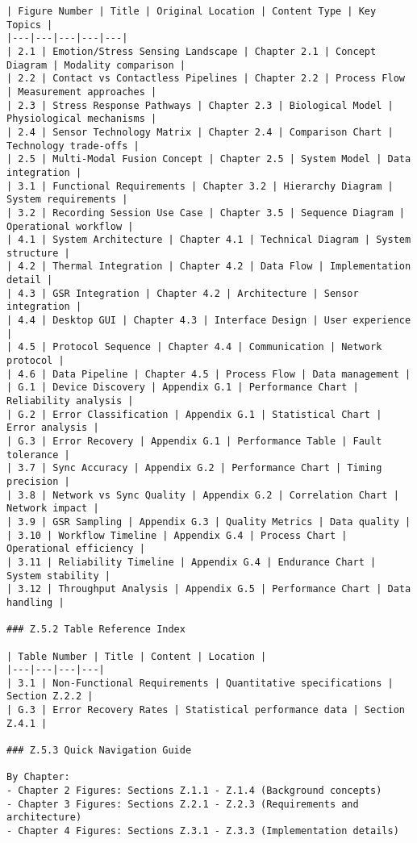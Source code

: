 \begin{verbatim}
| Figure Number | Title | Original Location | Content Type | Key Topics |
|---|---|---|---|---|
| 2.1 | Emotion/Stress Sensing Landscape | Chapter 2.1 | Concept Diagram | Modality comparison |
| 2.2 | Contact vs Contactless Pipelines | Chapter 2.2 | Process Flow | Measurement approaches |
| 2.3 | Stress Response Pathways | Chapter 2.3 | Biological Model | Physiological mechanisms |
| 2.4 | Sensor Technology Matrix | Chapter 2.4 | Comparison Chart | Technology trade-offs |
| 2.5 | Multi-Modal Fusion Concept | Chapter 2.5 | System Model | Data integration |
| 3.1 | Functional Requirements | Chapter 3.2 | Hierarchy Diagram | System requirements |
| 3.2 | Recording Session Use Case | Chapter 3.5 | Sequence Diagram | Operational workflow |
| 4.1 | System Architecture | Chapter 4.1 | Technical Diagram | System structure |
| 4.2 | Thermal Integration | Chapter 4.2 | Data Flow | Implementation detail |
| 4.3 | GSR Integration | Chapter 4.2 | Architecture | Sensor integration |
| 4.4 | Desktop GUI | Chapter 4.3 | Interface Design | User experience |
| 4.5 | Protocol Sequence | Chapter 4.4 | Communication | Network protocol |
| 4.6 | Data Pipeline | Chapter 4.5 | Process Flow | Data management |
| G.1 | Device Discovery | Appendix G.1 | Performance Chart | Reliability analysis |
| G.2 | Error Classification | Appendix G.1 | Statistical Chart | Error analysis |
| G.3 | Error Recovery | Appendix G.1 | Performance Table | Fault tolerance |
| 3.7 | Sync Accuracy | Appendix G.2 | Performance Chart | Timing precision |
| 3.8 | Network vs Sync Quality | Appendix G.2 | Correlation Chart | Network impact |
| 3.9 | GSR Sampling | Appendix G.3 | Quality Metrics | Data quality |
| 3.10 | Workflow Timeline | Appendix G.4 | Process Chart | Operational efficiency |
| 3.11 | Reliability Timeline | Appendix G.4 | Endurance Chart | System stability |
| 3.12 | Throughput Analysis | Appendix G.5 | Performance Chart | Data handling |

### Z.5.2 Table Reference Index

| Table Number | Title | Content | Location |
|---|---|---|---|
| 3.1 | Non-Functional Requirements | Quantitative specifications | Section Z.2.2 |
| G.3 | Error Recovery Rates | Statistical performance data | Section Z.4.1 |

### Z.5.3 Quick Navigation Guide

By Chapter:
- Chapter 2 Figures: Sections Z.1.1 - Z.1.4 (Background concepts)
- Chapter 3 Figures: Sections Z.2.1 - Z.2.3 (Requirements and architecture)
- Chapter 4 Figures: Sections Z.3.1 - Z.3.3 (Implementation details)


\end{verbatim}
